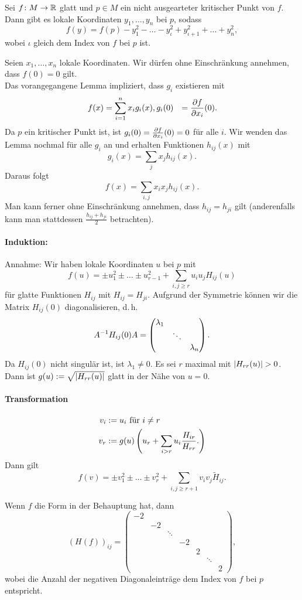 Sei $f \colon M \overset{}{\rightarrow} \mathbb{R}$ glatt und $p \in M$ ein nicht ausgearteter kritischer Punkt von $f$. Dann gibt es lokale Koordinaten $y_1,\ldots, y_n$ bei $p$, sodass
\[ f(y) = f(p) - y_1^2 - \ldots - y_\iota^2 + y_{\iota+1}^2 + \ldots + y_n^2, \]
wobei $\iota$ gleich dem Index von $f$ bei $p$ ist.
\begin{Beweis}{}
Seien $x_1, \ldots, x_n$ lokale Koordinaten. Wir dürfen ohne Einschränkung annehmen, dass $f(0) = 0$ gilt.\\
Das vorangegangene Lemma impliziert, dass $g_i$ existieren mit
\begin{align*}
f(x) &= \sum_{i = 1}^n x_i g_i(x),
g_i(0) &= \frac{\partial f}{\partial x_i}(0).
\end{align*}
Da $p$ ein kritischer Punkt ist, ist $g_i(0) = \frac{\partial f}{\partial x_i}(0) = 0$ für alle $i$. Wir wenden das Lemma nochmal für alle $g_i$ an und erhalten Funktionen $h_{ij}(x)$ mit
\[ g_i(x) = \sum_j x_j h_{ij}(x). \]
Daraus folgt
\[ f(x) = \sum_{i,j} x_i x_j h_{ij}(x). \]
Man kann ferner ohne Einschränkung annehmen, dass $h_{ij} = h_{ji}$ gilt (anderenfalls kann man stattdessen $\frac{h_{ij} + h_{ji}}{2}$ betrachten).
\paragraph{Induktion:}
Annahme: Wir haben lokale Koordinaten $u$ bei $p$ mit
\[ f(u) = \pm u_1^2 \pm \ldots \pm u_{r-1}^2 + \sum_{i,j\geq r} u_i u_j H_{ij}(u) \]
für glatte Funktionen $H_{ij}$ mit $H_{ij} = H_{ji}$. Aufgrund der Symmetrie können wir die Matrix $H_{ij}(0)$ diagonalisieren, d.\,h.
\[ A^{-1} H_{ij}(0)A = \left(
\begin{matrix}
\lambda_1 \\
& \ddots \\
& & \lambda_n
\end{matrix}
\right). \]
Da $H_{ij}(0)$ nicht singulär ist, ist $\lambda_1 \neq 0$. Es sei $r$ maximal mit $\left|H_{rr}(u)\right| > 0$. Dann ist $g(u) := \sqrt{\left|H_{rr}(u)\right|}$ glatt in der Nähe von $u = 0$.\\
\paragraph{Transformation}
\begin{align*}
v_i &:= u_i \text{ für } i \neq r\\
v_r &:= g(u)\left(
u_r + \sum_{i > r}u_i \frac{H_{ir}}{H_{rr}}.
\right)
\end{align*}
Dann gilt
\[ f(v) = \pm v_1^2 \pm \ldots \pm v_r^2 + \sum_{i,j \geq r+ 1}v_i v_j \widetilde{H}_{ij}. \]
\end{Beweis}
Wenn $f$ die Form in der Behauptung hat, dann
\[ (H(f))_{ij} = \left(
\begin{matrix}
-2 \\
& -2\\
& & \ddots \\
& & & -2\\
& & & & 2 \\
& & & & & \ddots\\
& & & & & & 2
\end{matrix}
\right), \]
wobei die Anzahl der negativen Diagonaleinträge dem Index von $f$ bei $p$ entspricht.

